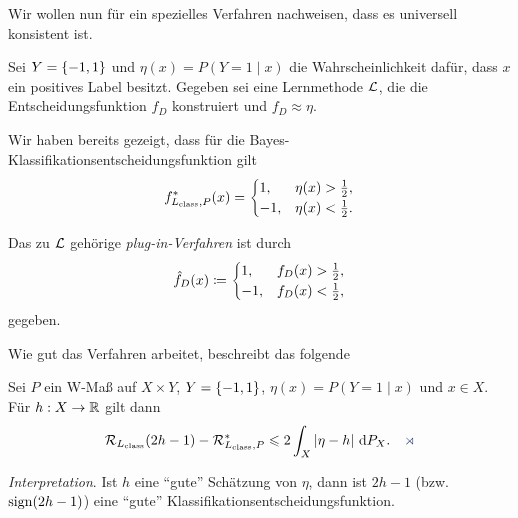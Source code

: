 Wir wollen nun für ein spezielles Verfahren nachweisen, dass es universell
konsistent ist.

Sei $Y=\left\{ -1,1 \right\}$ und $\eta(x) = P(Y=1\mid x)$ die Wahrscheinlichkeit dafür,
dass $x$ ein positives Label besitzt. Gegeben sei eine Lernmethode $\mathcal{L}$, die
die Entscheidungsfunktion $f_D$ konstruiert und $f_D\approx \eta$.

Wir haben bereits gezeigt, dass für die
Bayes-Klassifikationsentscheidungsfunktion gilt
\begin{align*}
f_{L_{\mathrm{class}},P}^*(x) =
\begin{cases}
1, & \eta(x)> \frac{1}{2},\\
-1, & \eta(x) < \frac{1}{2}.
\end{cases}
\end{align*}

\begin{defn}
\label{defn:1.3.2}
Das zu $\mathcal{L}$ gehörige \emph{plug-in-Verfahren} ist durch
\begin{align*}
\hat{f}_D(x) \coloneq
\begin{cases}
1, & f_D(x) > \frac{1}{2},\\
-1, & f_D(x) < \frac{1}{2},
\end{cases}
\end{align*}
gegeben.\fishhere
\end{defn}

Wie gut das Verfahren arbeitet, beschreibt das folgende
\begin{lem}
\label{prop:1.3.3}
Sei $P$ ein W-Maß auf $X\times Y$, $Y=\left\{ -1,1 \right\}$, $\eta(x) = P(Y=1\mid x)$
und $x\in X$. Für $h:X\to\mathbb{R}$ gilt dann
\begin{align*}
\RR_{L_\class}(2h-1) - \RR_{L_\class,P}^*
\le 2 \int_X \abs{\eta-h}\dP_X.\fishhere
\end{align*}
\end{lem}

\textit{Interpretation}. Ist $h$ eine ``gute'' Schätzung von $\eta$, dann ist
$2h-1$ (bzw. $\operatorname{sign} (2h-1)$) eine ``gute'' Klassifikationsentscheidungsfunktion.

